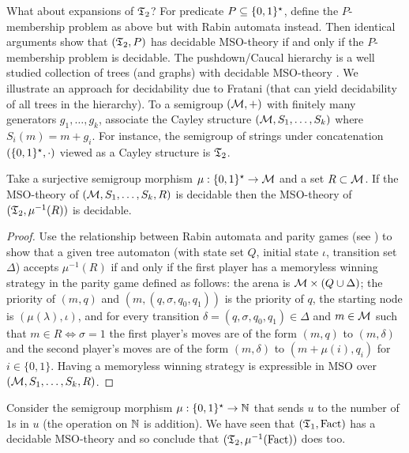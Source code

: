 What about expansions of $\mathfrak{T}_2$? For predicate $P \subseteq \{0,1\}^\star$, define the $P$-membership problem as above but with Rabin automata instead. Then identical arguments show that $(\mathfrak{T}_2,P)$ has decidable MSO-theory if and only if the $P$-membership problem is decidable.  The pushdown/Caucal hierarchy is a well studied collection of trees (and graphs) 
with decidable MSO-theory \cite{Cauc02} \cite{Thom03}. We illustrate an approach for decidability due to Fratani \cite{Frat05} (that can yield decidability of all trees in the hierarchy). To a semigroup $({\mathcal M},+)$ with finitely many generators $g_1,\dots,g_k$, associate the Cayley structure 
$({\mathcal M},S_1,\dots,S_k)$ where $S_i(m) = m+ g_i$. For instance, the semigroup of strings under concatenation $(\{0,1\}^\star,\cdot)$ viewed as a Cayley structure is
$\mathfrak{T}_2$.  

\begin{theorem} \cite{Frat05}
Take a surjective semigroup morphism $\mu:\{0,1\}^\star \to {\mathcal M}$ and a set
$R \subset {\mathcal M}$. If  the MSO-theory of $({\mathcal M},S_1,\dots,S_k,R)$ is decidable then the MSO-theory of $(\mathfrak{T}_2,\mu^{-1}(R))$ is decidable. 
\end{theorem}

\begin{proof}
Use the relationship between Rabin automata and parity games (see \cite{Thom90}) to show that a given tree automaton (with state set $Q$, initial state $\iota$, transition set $\Delta$) accepts $\mu^{-1}(R)$ if and only if the first player has a memoryless winning strategy in the parity game defined as follows: the arena is ${\mathcal M} \times (Q \cup \Delta)$; the priority of $(m,q)$ and $(m,(q,\sigma,q_0,q_1))$ is the priority of $q$, the starting node is $(\mu(\lambda),\iota)$, and for every transition $\delta = (q,\sigma,q_0,q_1) \in \Delta$ and $m \in {\mathcal M}$ such that $m \in R \iff \sigma = 1$ the first player's moves are of the form $(m,q)$ to $(m,\delta)$ and the second player's moves are of the form $(m,\delta)$ to $(m+\mu(i),q_{i})$ for $i \in \{0,1\}$. Having a memoryless winning strategy is expressible in MSO over $({\mathcal M},S_1,\dots,S_k,R)$.
\end{proof}

\begin{example}
Consider the semigroup morphism  $\mu:\{0,1\}^\star \to \mathbb{N}$ that sends
$u$ to the number of $1$s in $u$ (the operation on $\mathbb{N}$ is addition). We have seen that $(\mathfrak{T}_1,\textrm{Fact})$ has a decidable MSO-theory and so conclude that
$(\mathfrak{T}_2,\mu^{-1}(\textrm{Fact}))$ does too.
\end{example}


